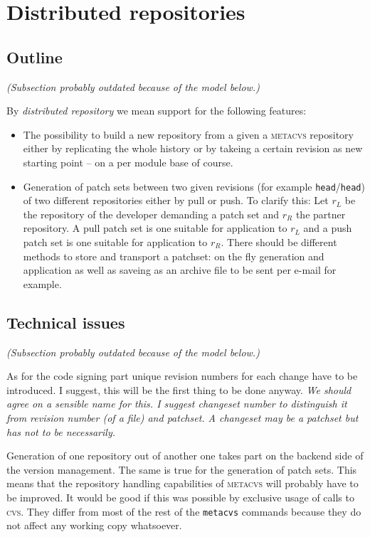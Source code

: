 \documentclass[fleqn, german, 10pt, a4paper]{article}
\begin{document}
\section{Distributed repositories}

\subsection{Outline}
\emph{(Subsection probably outdated because of the model below.)}

By \emph{distributed repository} we mean support for the following
features:

\begin{itemize}
\item The possibility to build a new repository from a given a 
\textsc{metacvs} repository either by replicating the whole history or
by takeing a certain revision as new starting point -- on a per module
base of course.
\item Generation of patch sets between two given revisions (for example
\texttt{head}/\texttt{head}) of two different repositories either by pull
or push. To clarify this: Let $r_L$ be the repository of the developer
demanding a patch set and $r_R$ the partner repository. A pull patch set
is one suitable for application to $r_L$ and a push patch set is one
suitable for application to $r_R$.
There should be different methods to store and transport a patchset:
on the fly generation and application as well as saveing as an archive file
to be sent per e-mail for example.
\end{itemize}

\subsection{Technical issues}
\emph{(Subsection probably outdated because of the model below.)}

As for the code signing part unique revision numbers for each change have
to be introduced. I suggest, this will be the first thing to be done anyway.
\emph{We should agree on a sensible name for this. I suggest changeset number
to distinguish it from revision number (of a file) and patchset. A changeset
may be a patchset but has not to be necessarily.}

Generation of one repository out of another one takes part on the backend
side of the version management. The same is true for the generation
of patch sets. This means that the repository handling capabilities of
\textsc{metacvs} will probably have to be improved. It would be good if
this was possible by exclusive usage of calls to \textsc{cvs}.
They differ from most of the rest of the \texttt{metacvs} commands
because they do not affect any working copy whatsoever.
\end{document}
